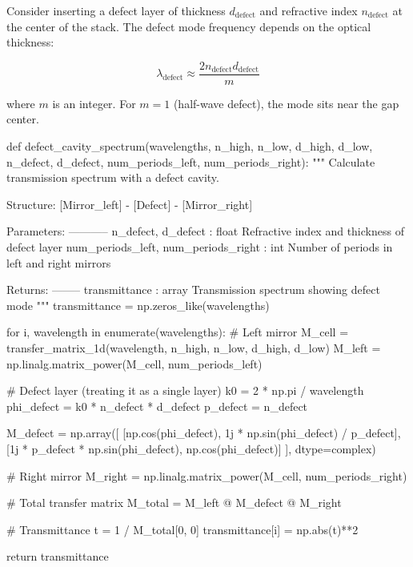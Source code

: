 \documentclass[11pt,a4paper]{article}
\begin{document}
Consider inserting a defect layer of thickness $d_{\text{defect}}$ and refractive index $n_{\text{defect}}$ at the center of the stack. The defect mode frequency depends on the optical thickness:

\begin{equation}
\lambda_{\text{defect}} \approx \frac{2 n_{\text{defect}} d_{\text{defect}}}{m}
\end{equation}

where $m$ is an integer. For $m=1$ (half-wave defect), the mode sits near the gap center.

\begin{pycode}
def defect_cavity_spectrum(wavelengths, n_high, n_low, d_high, d_low,
                          n_defect, d_defect, num_periods_left, num_periods_right):
    """
    Calculate transmission spectrum with a defect cavity.

    Structure: [Mirror_left] - [Defect] - [Mirror_right]

    Parameters:
    -----------
    n_defect, d_defect : float
        Refractive index and thickness of defect layer
    num_periods_left, num_periods_right : int
        Number of periods in left and right mirrors

    Returns:
    --------
    transmittance : array
        Transmission spectrum showing defect mode
    """
    transmittance = np.zeros_like(wavelengths)

    for i, wavelength in enumerate(wavelengths):
        # Left mirror
        M_cell = transfer_matrix_1d(wavelength, n_high, n_low, d_high, d_low)
        M_left = np.linalg.matrix_power(M_cell, num_periods_left)

        # Defect layer (treating it as a single layer)
        k0 = 2 * np.pi / wavelength
        phi_defect = k0 * n_defect * d_defect
        p_defect = n_defect

        M_defect = np.array([
            [np.cos(phi_defect), 1j * np.sin(phi_defect) / p_defect],
            [1j * p_defect * np.sin(phi_defect), np.cos(phi_defect)]
        ], dtype=complex)

        # Right mirror
        M_right = np.linalg.matrix_power(M_cell, num_periods_right)

        # Total transfer matrix
        M_total = M_left @ M_defect @ M_right

        # Transmittance
        t = 1 / M_total[0, 0]
        transmittance[i] = np.abs(t)**2

    return transmittance


\end{pycode}
\end{document}

